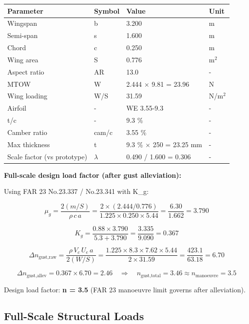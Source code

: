\documentclass[10pt,a4paper]{article}
\begin{document}
\begin{center}
\begin{tabular}{|l|l|l|l|}
\hline
Parameter & Symbol & Value & Unit \\
\hline
Wingspan & b & 3.200 & m \\
\hline
Semi-span & s & 1.600 & m \\
\hline
Chord & c & 0.250 & m \\
\hline
Wing area & S & 0.776 & m$^{2}$ \\
\hline
Aspect ratio & AR & 13.0 & - \\
\hline
MTOW & W & 2.444 ${\times}$ 9.81 = 23.96 & N \\
\hline
Wing loading & W/S & 31.59 & N/m$^{2}$ \\
\hline
Airfoil & - & WE 3.55-9.3 & - \\
\hline
t/c & - & 9.3 \% & - \\
\hline
Camber ratio & cam/c & 3.55 \% & - \\
\hline
Max thickness & t & 9.3 \% ${\times}$ 250 = 23.25 mm & - \\
\hline
Scale factor (vs prototype) & ${\lambda}$ & 0.490 / 1.600 = 0.306 & - \\
\hline
\end{tabular}
\end{center}

\textbf{Full-scale design load factor (after gust alleviation):}

Using FAR 23 No.23.337 / No.23.341 with K\_g:

\[
\mu_g = \frac{2(m/S)}{\rho\,c\,a} = \frac{2 \times (2.444/0.776)}{1.225 \times 0.250 \times 5.44} = \frac{6.30}{1.662} = 3.790
\]

\[
K_g = \frac{0.88 \times 3.790}{5.3 + 3.790} = \frac{3.335}{9.090} = 0.367
\]

\[
\Delta n_{\text{gust,raw}} = \frac{\rho\,V_c\,U_e\,a}{2(W/S)} = \frac{1.225 \times 8.3 \times 7.62 \times 5.44}{2 \times 31.59} = \frac{423.1}{63.18} = 6.70
\]

\[
\Delta n_{\text{gust,allev}} = 0.367 \times 6.70 = 2.46 \quad \Rightarrow \quad n_{\text{gust,total}} = 3.46 \approx n_{\text{manoeuvre}} = 3.5
\]

Design load factor: \textbf{n = 3.5} (FAR 23 manoeuvre limit governs after alleviation).


\subsection{Full-Scale Structural Loads}
\end{document}
